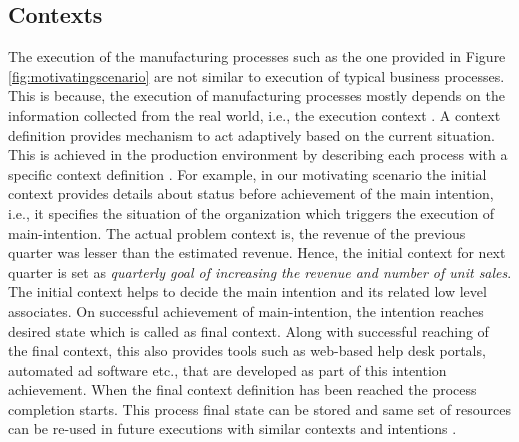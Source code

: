 \subsection{Contexts} 
\label{sec:contexts}
The execution of the manufacturing processes such as the one provided in Figure \ref{fig:motivatingscenario} are not similar to execution of typical business processes. This is because, the execution of manufacturing processes mostly depends on the information collected from the real world, i.e., the execution context \cite{Sungur2016}. A context definition provides mechanism to act adaptively based on the current situation. This is achieved in the production environment by describing each process with a specific context definition \cite{Sungur2016}. For example, in our motivating scenario the initial context provides details about status before achievement of the main intention, i.e., it specifies the situation of the organization which triggers the execution of main-intention. The actual problem context is, the revenue of the previous quarter was lesser than the estimated revenue. Hence, the initial context for next quarter is set as \textit{quarterly goal of increasing the revenue and number of unit sales}. The initial context helps to decide the main intention and its related low level associates. On successful achievement of main-intention, the intention reaches desired state which is called as final context. Along with successful reaching of the final context, this also provides tools such as web-based help desk portals, automated ad software etc., that are developed as part of this intention achievement. When the final context definition has been reached the process completion starts. This process final state can be stored and same set of resources can be re-used in future executions with similar contexts and intentions \cite{Sungur2015}.
 
